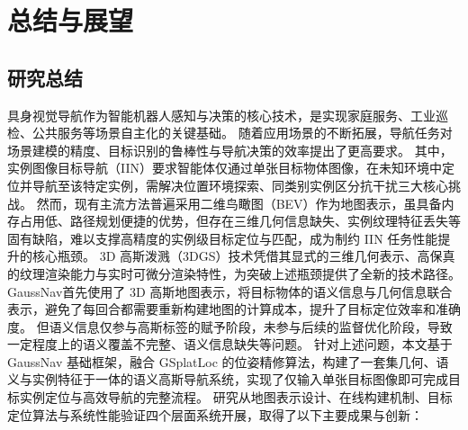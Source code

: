 \chapter{总结与展望}
\section {研究总结}
具身视觉导航作为智能机器人感知与决策的核心技术，是实现家庭服务、工业巡检、公共服务等场景自主化的关键基础。
随着应用场景的不断拓展，导航任务对场景建模的精度、目标识别的鲁棒性与导航决策的效率提出了更高要求。
其中，实例图像目标导航（IIN）要求智能体仅通过单张目标物体图像，在未知环境中定位并导航至该特定实例，需解决位置环境探索、同类别实例区分抗干扰三大核心挑战。
然而，现有主流方法普遍采用二维鸟瞰图（BEV）作为地图表示，虽具备内存占用低、路径规划便捷的优势，但存在三维几何信息缺失、实例纹理特征丢失等固有缺陷，难以支撑高精度的实例级目标定位与匹配，成为制约 IIN 任务性能提升的核心瓶颈。
3D 高斯泼溅（3DGS）技术凭借其显式的三维几何表示、高保真的纹理渲染能力与实时可微分渲染特性，为突破上述瓶颈提供了全新的技术路径。
GaussNav\cite{gaussnav}首先使用了 3D 高斯地图表示，将目标物体的语义信息与几何信息联合表示，避免了每回合都需要重新构建地图的计算成本，提升了目标定位效率和准确度。
但语义信息仅参与高斯标签的赋予阶段，未参与后续的监督优化阶段，导致一定程度上的语义覆盖不完整、语义信息缺失等问题。
针对上述问题，本文基于 GaussNav\cite{gaussnav} 基础框架，融合 GSplatLoc\cite{gsplatloc} 的位姿精修算法，构建了一套集几何、语义与实例特征于一体的语义高斯导航系统，实现了仅输入单张目标图像即可完成目标实例定位与高效导航的完整流程。
研究从地图表示设计、在线构建机制、目标定位算法与系统性能验证四个层面系统开展，取得了以下主要成果与创新：
